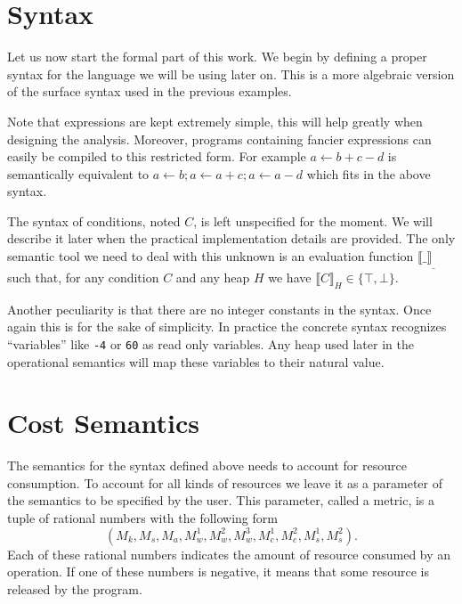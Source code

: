 \documentclass[10pt]{article}
\begin{document}
\section{Syntax}

Let us now start the formal part of this work.  We begin by defining
a proper syntax for the language we will be using later on.  This is
a more algebraic version of the surface syntax used in the previous
examples.
%

Note that expressions are kept extremely simple, this will help
greatly when designing the analysis.  Moreover, programs
containing fancier expressions can easily be compiled to this
restricted form.  For example $a \gets b + c - d$ is semantically
equivalent to $a \gets b; a \gets a + c; a \gets a - d$ which
fits in the above syntax.

The syntax of conditions, noted $C$, is left unspecified
for the moment.  We will describe it later when the practical
implementation details are provided.  The only semantic tool
we need to deal with this unknown is an evaluation
function $\llbracket \_ \rrbracket_{\_}$ such that, for any
condition $C$ and any heap $H$ we have $\llbracket
C \rrbracket_H \in \{ \top, \bot \}$.

Another peculiarity is that there are no integer constants in the
syntax.  Once again this is for the sake of simplicity.  In practice
the concrete syntax recognizes ``variables'' like {\tt -4} or
{\tt 60} as read only variables.  Any heap used later in the
operational semantics will map these variables to their natural
value.

\section{Cost Semantics}

The semantics for the syntax defined above needs to account
for resource consumption.  To account for all kinds of resources
we leave it as a parameter of the semantics to be specified
by the user.  This parameter, called a metric, is a tuple of rational
numbers with the following form
$$
(
M_k, M_s, M_a,
M_w^1, M_w^2, M_w^3,
M_c^1, M_c^2,
M_s^1, M_s^2
).
$$
Each of these rational numbers indicates the amount of resource
consumed by an operation.  If one of these numbers is negative,
it means that some resource is released by the program.
\end{document}
